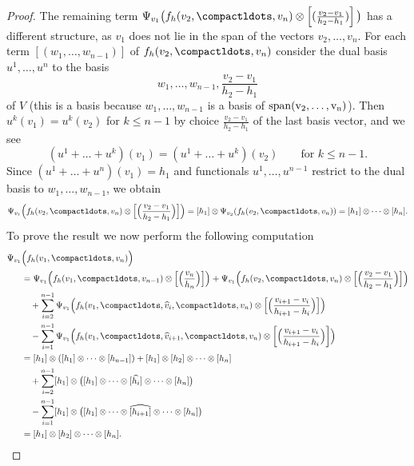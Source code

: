 \documentclass[a4paper]{amsart}
\begin{document}
\begin{proof}
The remaining term $\Psi_{v_1}\big(f_h(v_2,\compactldots,v_n)\otimes \left[(\tfrac{v_{2}-v_1}{h_{2}-h_1})\right]\big)$ has a different structure, as $v_1$ does not lie in the span of the vectors $v_2,\dots,v_n$. For each term $[(w_1,\dots,w_{n-1})]$ of $f_h(v_2,\compactldots,v_n)$ consider the dual basis $u^1,\dots,u^{n}$ to the basis 
\[
w_1,\dots,w_{n-1}, \frac{v_2-v_1}{h_{2}-h_1}
\]
of $V$ (this is a basis because $w_1,\ldots,w_{n-1}$ is a basis of $\rm{span}(v_2,\ldots,v_n)$). Then $u^k(v_1)=u^k(v_2)$ for $k \leq n-1$ by choice $\tfrac{v_2-v_1}{h_{2}-h_1}$ of the last basis vector, and we see 
\[
(u^1+\dots+u^k)(v_1)=(u^1+\dots+u^k)(v_2) \qquad \text{for $k \leq n-1$.}
\]
Since $(u^1+\dots+u^n)(v_1)=h_1$ and functionals $u^1,\dots, u^{n-1}$ restrict to the dual basis to $w_1,\dots,w_{n-1}$, we obtain 
\[
\Psi_{v_1}\Bigl(f_h(v_2,\compactldots,v_n)\otimes \Bigl[\Bigl(\frac{v_{2}-v_1}{h_{2}-h_1}\Bigr)\Bigr]\Bigr)=[h_1] \otimes \Psi_{v_2}(f_h(v_2,\compactldots,v_n))=[h_1] \otimes \dots \otimes [h_n].
\]
To prove the result we now perform the following computation
\begin{equation*}\begin{aligned}
\Psi_{v_1}&\Bigl(f_h(v_1,\compactldots,v_n)\Bigr)\\
&=\Psi_{v_1}\Bigl ( f_h(v_1,\compactldots,v_{n-1})\otimes \Bigl[\Bigl(\frac{v_n}{h_n}\Bigr)\Bigr]\Bigr) +\Psi_{v_1}\Bigl (f_h(v_2,\compactldots,v_n)\otimes \Bigl[\Bigl(\frac{v_{2}-v_1}{h_{2}-h_1}\Bigr)\Bigr]\Bigr)\\
&\quad +\sum_{i=2}^{n-1} \Psi_{v_1}\Bigl(f_h(v_1,\compactldots,\widehat{v}_i,\compactldots,v_n)\otimes \Bigl[\Bigl(\frac{v_{i+1}-v_i}{h_{i+1}-h_i}\Bigr)\Bigr]\Bigr)\\
&\quad - \sum_{i=1}^{n-1}\Psi_{v_1}\Bigl(f_h(v_1,\compactldots,\widehat{v}_{i+1},\compactldots,v_n)\otimes \left[\Bigl(\frac{v_{i+1}-v_i}{h_{i+1}-h_i}\Bigr)\right]\Bigr)\\
&= [h_1]\otimes ( [h_1] \otimes \dots \otimes [h_{n-1}])+[h_1] \otimes [h_2]\otimes \dots \otimes [h_n]\\
&\quad +\sum_{i=2}^{n-1} [h_1] \otimes \bigl([h_1]\otimes \dots \otimes [\widehat{h_{i}}] \otimes \dots \otimes [h_n]\bigr)\\
&\quad - \sum_{i=1}^{n-1}[h_1] \otimes \bigl([h_1]\otimes \dots \otimes \widehat{[h_{i+1}]} \otimes \dots \otimes [h_n]\bigr)\\
&=[h_1] \otimes [h_2]\otimes \dots \otimes [h_n].
\end{aligned}\end{equation*} 
\end{proof}
\end{document}
